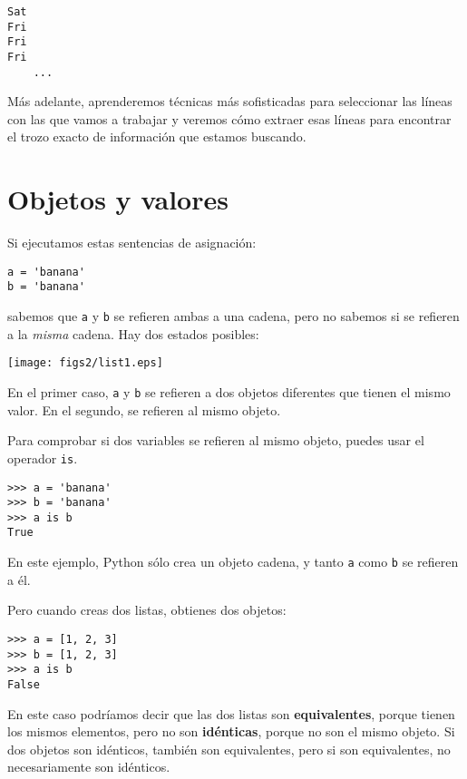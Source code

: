 \beforeverb
\begin{verbatim}
Sat
Fri
Fri
Fri
    ...
\end{verbatim}
\afterverb
%
Más adelante, aprenderemos técnicas más sofisticadas para
seleccionar las líneas con las que vamos a trabajar y veremos cómo extraer
esas líneas para encontrar el trozo exacto de información
que estamos buscando.

\section{Objetos y valores}


Si ejecutamos estas sentencias de asignación:

\beforeverb
\begin{verbatim}
a = 'banana'
b = 'banana'
\end{verbatim}
\afterverb
%
sabemos que {\tt a} y {\tt b} se refieren ambas a una
cadena, pero no sabemos si se refieren a la
\emph{misma} cadena. Hay dos estados posibles:


\beforefig
\centerline{\texttt{[image: figs2/list1.eps]}}
\afterfig

En el primer caso, {\tt a} y {\tt b} se refieren a dos objetos diferentes que
tienen el mismo valor. En el segundo, se refieren al mismo
objeto.


Para comprobar si dos variables se refieren al mismo objeto, puedes
usar el operador {\tt is}.

\beforeverb
\begin{verbatim}
>>> a = 'banana'
>>> b = 'banana'
>>> a is b
True
\end{verbatim}
\afterverb
%
En este ejemplo, Python sólo crea un objeto cadena,
y tanto {\tt a} como {\tt b} se refieren a él.

Pero cuando creas dos listas, obtienes dos objetos:

\beforeverb
\begin{verbatim}
>>> a = [1, 2, 3]
>>> b = [1, 2, 3]
>>> a is b
False
\end{verbatim}
\afterverb
%

En este caso podríamos decir que las dos listas son {\bf equivalentes},
porque tienen los mismos elementos, pero no son {\bf idénticas}, porque
no son el mismo objeto. Si dos objetos son idénticos, también
son equivalentes, pero si son equivalentes, no necesariamente
son idénticos.

